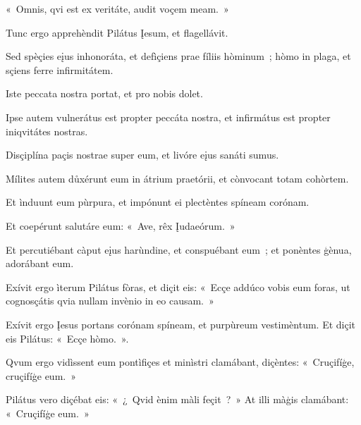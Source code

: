 «~Omnis, qvi est ex veritáte, audit voçem meam.~» 

Tunc ergo apprehèndit Pilátus Įesum, et flagellávit. 

Sed spèçies eįus inhonoráta, et defìçiens prae fíliis hòminum~; hòmo in plaga, et sçiens ferre infirmitátem. 

Iste peccata nostra portat, et pro nobis dolet. 

Ipse autem vulnerátus est propter peccáta nostra, et infirmátus est propter iniqvitátes nostras. 

Disçiplína paçis nostrae super eum, et livóre eįus sanáti sumus. 


Mílites autem důxérunt eum in átrium praetórii, et cònvocant totam cohòrtem. 

Et ìnduunt eum pùrpura, et impónunt ei plectèntes spíneam corónam. 

Et coepérunt salutáre eum: «~Ave, rêx Įudaeórum.~» 

Et percutiébant càput eįus harùndine, et conspuébant eum~; et ponèntes ģènua, adorábant eum. 

Exívit ergo ìterum Pilátus fòras, et diçit eis: «~Ecçe addúco vobis eum foras, ut cognosçátis qvia nullam invènio in eo causam.~» 

Exívit ergo Įesus portans corónam spíneam, et purpùreum vestimèntum. Et diçit eis Pilátus: «~Ecçe hòmo.~». 

Qvum ergo vidìssent eum pontìfiçes et minìstri clamábant, diçèntes: «~Cruçifíģe, cruçifíģe eum.~» 

Pilátus vero diçébat eis: «~¿~Qvid ènim màli feçit~?~» At illi màģis clamábant: «~Cruçifíģe eum.~» 


